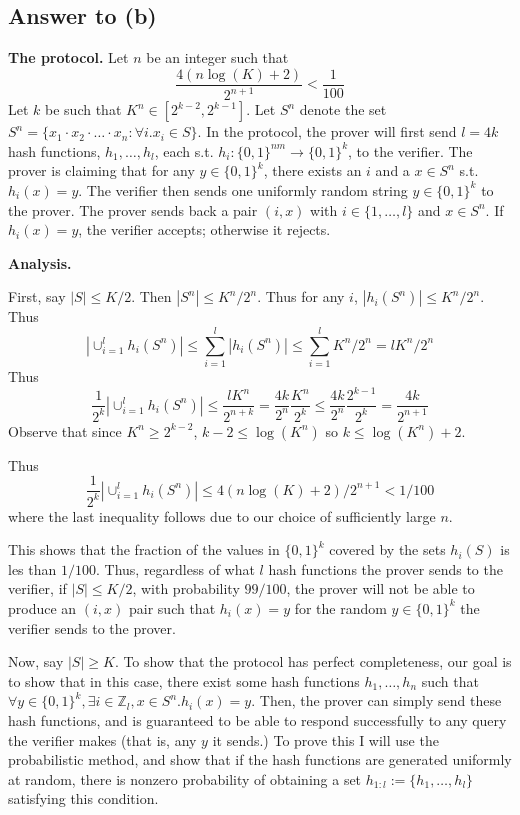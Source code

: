 \documentclass{article}
\begin{document}
\subsection*{Answer to (b)}
\textbf{The protocol.} 
Let $n$ be an integer such that
$$
\frac{4 (n \log(K) + 2)}{2^{n+1}} < \frac{1}{100}
$$
Let $k$ be such that $K^n \in [2^{k-2}, 2^{k-1}]$.
Let $S^n$ denote the set $S^n = \{x_1 \cdot x_2 \cdot \dots \cdot x_n : \forall i . x_i \in S\}$.
In the protocol,
the prover will first send $l = 4k$ hash functions,
$h_1, \dots, h_l$, each s.t. $h_i : \{0, 1\}^{nm} \to \{0, 1\}^k$,
to the verifier.
The prover is claiming that for any $y \in \{0, 1\}^k$,
there exists an $i$ and a $x \in S^n$ s.t. $h_i(x) = y$.
The verifier then sends one uniformly random string $y \in \{0, 1\}^k$ to the prover.
The prover sends back a pair $(i, x)$ with $i \in \{1, \dots, l\}$ and $x \in S^n$.
If $h_i(x) = y$, the verifier accepts; otherwise it rejects.

\medskip
\noindent
\textbf{Analysis.}

First, say $|S| \leq K/2$.
Then $|S^n| \leq K^n/2^n$.
Thus for any $i$, $|h_i(S^n)| \leq K^n/2^n$.
Thus
$$
|\cup_{i=1}^l h_i(S^n)| \leq \sum_{i=1}^l |h_i(S^n)|
\leq \sum_{i=1}^l K^n/2^n =
l K^n/2^n
$$
Thus
$$
\frac{1}{2^k}|\cup_{i=1}^l h_i(S^n)| \leq \frac{lK^n}{2^{n + k}}
= \frac{4k}{2^{n}} \frac{K^n}{2^k}
\leq \frac{4k}{2^{n}} \frac{2^{k-1}}{2^k}
= \frac{4k}{2^{n+1}}
$$
Observe that since $K^n \geq 2^{k-2}$, $k-2 \leq \log(K^n)$
so $k \leq \log(K^n) + 2$.

Thus
$$
\frac{1}{2^k}|\cup_{i=1}^l h_i(S^n)| \leq 4(n\log(K) + 2)/2^{n+1} < 1/100
$$
where the last inequality follows due to our choice of sufficiently large $n$.

This shows that the fraction of the values in $\{0, 1\}^k$ covered by the sets $h_i(S)$ is les than $1/100$.
Thus, regardless of what $l$ hash functions the prover sends to the verifier,
if $|S| \leq K/2$, with probability $99/100$, the prover will not be able to produce
an $(i, x)$ pair such that $h_i(x) = y$ for the random $y \in \{0, 1\}^k$ the verifier sends to the prover.

\medskip
Now, say $|S| \geq K$.
To show that the protocol has perfect completeness, our goal is to show that
in this case, there exist some hash functions $h_1, \dots, h_n$ such that
$\forall y \in \{0, 1\}^k, \exists i \in \mathbb{Z}_l, x \in S^n . h_i(x) = y$.
Then, the prover can simply send these hash functions,
and is guaranteed to be able to respond successfully to any query
the verifier makes (that is, any $y$ it sends.)
To prove this I will use the probabilistic method, and show that if 
the hash functions are generated uniformly at random, there is nonzero probability
of obtaining a set $h_{1:l} := \{h_1, \dots, h_l\}$ satisfying this condition.
\end{document}
